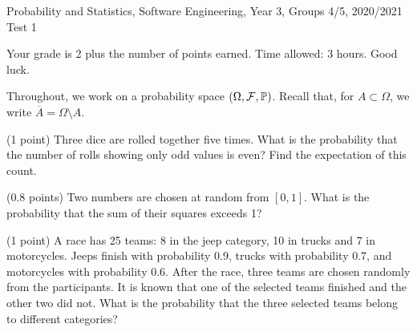 \documentclass[a4paper]{report}
\begin{document}
\noindent Probability and Statistics, Software Engineering, Year 3, Groups 4/5, 2020/2021 \hfill Test 1

\hrulefill

\begin{it}
Your grade is 2 plus the number of points earned. Time allowed: 3 hours. Good luck.

Throughout, we work on a probability space $(\Omega, {\mathcal{F}}, \mathbb P)$.
Recall that, for $A\subset\Omega$, we write $\overline A=\Omega\setminus A$.
\end{it}

\begin{problem} (1 point)
Three dice are rolled together five times. What is the probability that the number of rolls showing only odd values is even? Find the expectation
of this count.
\end{problem}

\begin{problem}(0.8 points)
Two numbers are chosen at random from $[0,1]$. What is the probability
that the sum of their squares exceeds 1?
\end{problem}


\begin{problem}(1 point)
A race has 25 teams: 8 in the jeep category, 10 in trucks
and 7 in motorcycles. Jeeps finish with probability 0.9, trucks with probability 0.7,
and motorcycles with probability 0.6. After the race, three teams are chosen randomly
from the participants.
It is known that one of the selected teams finished
and the other two did not. What is the probability that the three selected teams belong to different
categories?

\end{problem}
\end{document}
